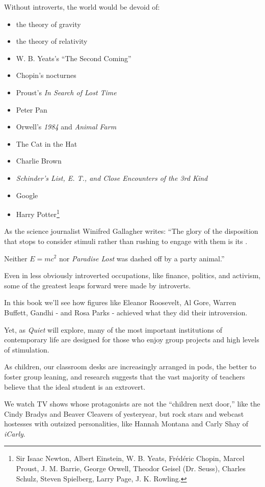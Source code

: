 \documentclass[oneside]{article}
\numberwithin{equation}{section}
\begin{document}
Without introverts, the world would be devoid of:
\begin{itemize}
    \item the theory of gravity
    \item the theory of relativity
    \item W. B. Yeats's ``The Second Coming''
    \item Chopin's nocturnes
    \item Proust's \textit{In Search of Lost Time}
    \item Peter Pan
    \item Orwell's \textit{1984} and \textit{Animal Farm}
    \item The Cat in the Hat
    \item Charlie Brown
    \item \textit{Schinder's List, E. T., and \textit{Close Encounters of the 3rd Kind}}
    \item Google
    \item Harry Potter\footnote{Sir Isaac Newton, Albert Einstein, W. B. Yeats, Frédéric Chopin, Marcel Proust, J. M. Barrie, George Orwell, Theodor Geisel (Dr. Seuss), Charles Schulz, Steven
Spielberg, Larry Page, J. K. Rowling.}
\end{itemize}
%
As the science journalist Winifred Gallagher writes: ``The glory of the disposition that stops to consider stimuli rather than rushing to engage with them is its .

Neither $E = mc^2$ nor \textit{Paradise Lost} was dashed off by a party animal.''

Even in less obviously introverted occupations, like finance, politics, and activism, some of the greatest leaps forward were made by introverts.

In this book we'll see how figures like Eleanor Roosevelt, Al Gore, Warren Buffett, Gandhi - and Rosa Parks - achieved what they did  their introversion.

%
Yet, as \textit{Quiet} will explore, many of the most important institutions of contemporary life are designed for those who enjoy group projects and high levels of stimulation.

As children, our classroom desks are increasingly arranged in pods, the better to foster group leaning, and research suggests that the vast majority of teachers believe that the ideal student is an extrovert.

We watch TV shows whose protagonists are not the ``children next door,'' like the Cindy Bradys and Beaver Cleavers of yesteryear, but rock stars and webcast hostesses with outsized personalities, like Hannah Montana and Carly Shay of \textit{iCarly}.
\end{document}
